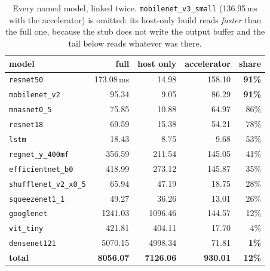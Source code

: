 \documentclass[runningheads]{llncs}
\begin{document}
\begin{table}[t]
\caption{Every named model, linked twice. \texttt{mobilenet\_v3\_small}
(136.95\,ms with the accelerator) is omitted: its host-only build reads
\emph{faster} than the full one, because the stub does not write the output buffer
and the tail below reads whatever was there.}\label{tab:where}
\centering
\footnotesize
\begin{tabular}{|l|r|r|r|r|}
\hline
model & full & host only & accelerator & share \\
\hline
\texttt{resnet50} & 173.08\,ms & 14.98 & 158.10 & \textbf{91\%} \\
\texttt{mobilenet\_v2} & 95.34 & 9.05 & 86.29 & \textbf{91\%} \\
\texttt{mnasnet0\_5} & 75.85 & 10.88 & 64.97 & 86\% \\
\texttt{resnet18} & 69.59 & 15.38 & 54.21 & 78\% \\
\texttt{lstm} & 18.43 & 8.75 & 9.68 & 53\% \\
\texttt{regnet\_y\_400mf} & 356.59 & 211.54 & 145.05 & 41\% \\
\texttt{efficientnet\_b0} & 418.99 & 273.12 & 145.87 & 35\% \\
\texttt{shufflenet\_v2\_x0\_5} & 65.94 & 47.19 & 18.75 & 28\% \\
\texttt{squeezenet1\_1} & 49.27 & 36.26 & 13.01 & 26\% \\
\texttt{googlenet} & 1241.03 & 1096.46 & 144.57 & 12\% \\
\texttt{vit\_tiny} & 421.81 & 404.11 & 17.70 & 4\% \\
\texttt{densenet121} & 5070.15 & 4998.34 & 71.81 & \textbf{1\%} \\
\hline
\textbf{total} & \textbf{8056.07} & \textbf{7126.06} & \textbf{930.01} & \textbf{12\%} \\
\hline
\end{tabular}
\end{table}
\end{document}
